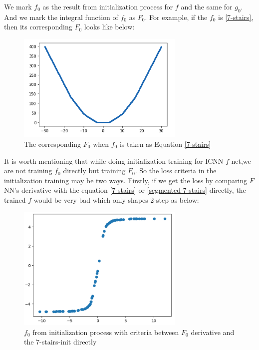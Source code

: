 \documentclass[conference,compsoc]{IEEEtran}
\begin{document}
We mark $f_0$ as the result from initialization process for $f$ and the same for $g_0$. And we mark the integral function of $f_0$ as $F_0$. For example, if the $f_0$ is \eqref{7-stairs}, then its corresponding $F_0$ looks like below:
\begin{figure}[htp]
  \centering
  \includegraphics[width=8cm]{images/piecewise_linear.png}
  \caption{The corresponding $F_0$ when $f_0$ is taken as Equation \eqref{7-stairs}}
  \label{fig:generate_data.ipynb}
\end{figure}

It is worth mentioning that while doing initialization training for ICNN $f$ net,we are not training $f_0$ directly but training $F_0$. So the loss criteria in the initialization training may be two ways. Firstly, if we get the loss by comparing $F$ NN's derivative with the equation \eqref{7-stairs} or \eqref{segmented-7-stairs} directly, the trained $f$ would be very bad which only shapes 2-step as below:
\begin{figure}[htp]
  \centering
  \includegraphics[width=8cm]{images/f_ICNN_withoutInit.png}
  \caption{$f_0$ from initialization process with criteria between $F_0$ derivative and the 7-stairs-init directly}
  \label{fig:train result}
\end{figure}
\end{document}
